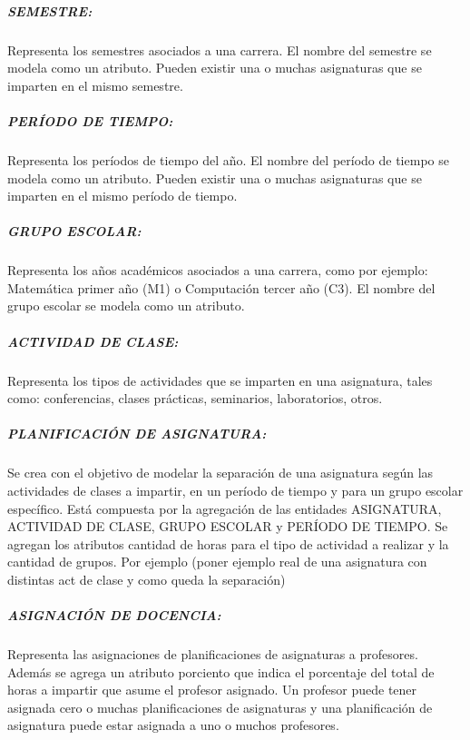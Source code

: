 \subparagraph{SEMESTRE:}
Representa los semestres asociados a una carrera. 
El nombre del semestre se modela como un atributo.
Pueden existir una o muchas asignaturas que se imparten en 
el mismo semestre. 


\subparagraph{PERÍODO DE TIEMPO:}
Representa los períodos de tiempo del año.
El nombre del período de tiempo se modela como un atributo.
Pueden existir una o muchas asignaturas que se imparten en 
el mismo período de tiempo.


\subparagraph{GRUPO ESCOLAR:}
Representa los años académicos asociados a una carrera, como por ejemplo:
Matemática primer año (M1) o Computación tercer año (C3).
El nombre del grupo escolar se modela como un atributo.

\subparagraph{ACTIVIDAD DE CLASE:}
Representa los tipos de actividades que se imparten en una asignatura, 
tales como: conferencias, clases prácticas, seminarios, laboratorios, otros. 

\subparagraph{PLANIFICACIÓN DE ASIGNATURA:}
Se crea con el objetivo de modelar la separación de una asignatura
según las actividades de clases a impartir, en un período de tiempo y para
un grupo escolar específico. Está compuesta por la agregación de las entidades ASIGNATURA, ACTIVIDAD DE CLASE, GRUPO 
ESCOLAR y PERÍODO DE TIEMPO.
Se agregan los atributos cantidad de horas para el tipo de actividad a realizar y 
la cantidad de grupos.
Por ejemplo (poner ejemplo real de una asignatura
con distintas act de clase y como queda la separación)






\subparagraph{ASIGNACIÓN DE DOCENCIA:}
Representa las asignaciones de planificaciones de asignaturas a profesores.
Además se agrega un atributo porciento que indica el porcentaje del total de horas 
a impartir que asume el profesor asignado. Un profesor puede 
tener asignada cero o muchas planificaciones de asignaturas y una planificación de 
asignatura puede estar asignada a uno o muchos profesores.


